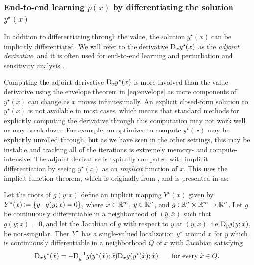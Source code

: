 \documentclass[twoside,11pt]{article}
\newcommand{\ie}{i.e.\xspace}
\begin{document}
\subsubsection{End-to-end learning $p(x)$ by differentiating the solution $y^\star(x)$}
In addition to differentiating through the value, the solution
$y^\star(x)$ can be implicitly differentiated.
We will refer to the derivative $\mathrm{D}_x y^\star(x)$
as the \emph{adjoint derivative}, and it is often used for
end-to-end learning
\citep{domke2012generic,gould2016differentiating,amos2017optnet,barratt2018differentiability,amos2019differentiable,agrawal2019differentiable,bai2019deep,bai2020multiscale}
and perturbation and sensitivity analysis
\citep{bank1982non,fiacco1990sensitivity,shapiro2003sensitivity,klatte2006nonsmooth,bonnans2013perturbation,still2018lectures,fiacco2020mathematical}.

Computing the adjoint derivative $\mathrm{D}_x y^\star(x)$ is more involved
than the value derivative using the envelope theorem
in \cref{eq:envelope} as more components of $y^\star(x)$
can change as $x$ moves infinitesimally.
An explicit closed-form solution to $y^\star(x)$ is
not available in most cases, which means that standard
methods for explicitly computing the derivative through
this computation may not work well or may break down.
For example, an optimizer to compute $y^\star(x)$ may be
explicitly unrolled through, but as we have seen in the
other settings, this may be instable and tracking all
of the iterations is extremely memory- and
compute-intensive.
The adjoint derivative is typically computed with implicit
differentiation by seeing $y^\star(x)$ as an \emph{implicit}
function of $x$.
This uses the implicit function theorem,
which is originally from \citet{dini1878analisi},
and is presented in \citet[Theorem 1B.1]{dontchev2009implicit} as:
\begin{theorem}
  \label{thm:dini}
  Let the roots of $g(y; x)$ define an implicit
  mapping $Y^\star(x)$ given by $Y^\star(x)\vcentcolon=\{y \mid g(y;x)=0\}$,
  where $x\in\mathbb{R}^m$, $y\in\mathbb{R}^n$, and
  $g: \mathbb{R}^n\times\mathbb{R}^m\rightarrow\mathbb{R}^n$.
  Let $g$ be continuously differentiable in a neighborhood of $(\bar y, \bar x)$
  such that $g(\bar y; \bar x)=0$, and let the Jacobian of $g$
  with respect to $y$ at $(\bar y, \bar x)$,
  \ie $\mathrm{D}_y g(\bar y; \bar x)$, be non-singular.
  Then $Y^\star$ has a single-valued localization $y^\star$
  around $\bar x$ for $\bar y$ which is continuously differentiable
  in a neighborhood $Q$ of $\bar x$ with Jacobian satisfying
  \begin{equation}
    \mathrm{D}_x y^\star(\tilde x) = -\mathrm{D}_y^{-1} g(y^\star(\tilde x); \tilde x) \mathrm{D}_x g(y^\star(\tilde x); \tilde x)
    \qquad \mathrm{for\ every}\; \tilde x\in Q.
    \label{eq:implicit-derivative}
  \end{equation}
\end{theorem}
\end{document}
